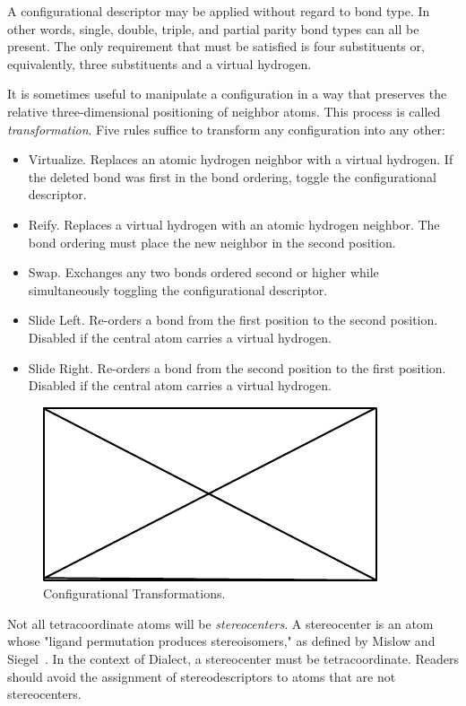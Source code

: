 \documentclass{article}
\begin{document}
A configurational descriptor may be applied without regard to bond type. In other words, single, double, triple, and partial parity bond types can all be present. The only requirement that must be satisfied is four substituents or, equivalently, three substituents and a virtual hydrogen.

It is sometimes useful to manipulate a configuration in a way that preserves the relative three-dimensional positioning of neighbor atoms. This process is called \textit{transformation}. Five rules suffice to transform any configuration into any other:

\begin{itemize}
    \item{Virtualize. Replaces an atomic hydrogen neighbor with a virtual hydrogen. If the deleted bond was first in the bond ordering, toggle the configurational descriptor.}
    \item{Reify. Replaces a virtual hydrogen with an atomic hydrogen neighbor. The bond ordering must place the new neighbor in the second position.}
    \item{Swap. Exchanges any two bonds ordered second or higher while simultaneously toggling the configurational descriptor.}
    \item{Slide Left. Re-orders a bond from the first position to the second position. Disabled if the central atom carries a virtual hydrogen.}
    \item{Slide Right. Re-orders a bond from the second position to the first position. Disabled if the central atom carries a virtual hydrogen.}
\end{itemize}

\begin{figure}
    \centering
    \includegraphics{filler}
    \caption{Configurational Transformations.}
    \label{fig:iconfigurational-transformations}
\end{figure}

Not all tetracoordinate atoms will be \textit{stereocenters}. A stereocenter is an atom whose "ligand permutation produces stereoisomers," as defined by Mislow and Siegel~\cite{mislow:1984}. In the context of Dialect, a stereocenter must be tetracoordinate. Readers should avoid the assignment of stereodescriptors to atoms that are not stereocenters.
\end{document}
